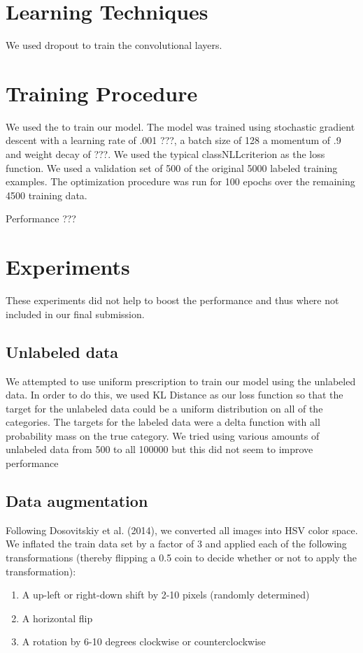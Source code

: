 \documentclass{article} %
\begin{document}
\section{Learning Techniques}

We used dropout to train the convolutional layers.

\section{Training Procedure}

We used the to train our model. The model was trained 
using stochastic gradient descent with a learning rate of .001 ???,
a batch size of 128 a momentum of .9 and weight decay of ???.  We
used the typical classNLLcriterion as the loss function. We used a validation set of 500 
of the original 5000 labeled training examples. The optimization procedure was run for 
100 epochs over the remaining 4500 training data.

Performance ???

\section{Experiments}

These experiments did not help to boost the performance and thus where not included in our final submission.

\subsection{Unlabeled data}
We attempted to use uniform prescription to train our model using the unlabeled data. In order to 
do this, we used KL Distance as our loss function so that the target for the unlabeled data could be
a uniform distribution on all of the categories. The targets for the labeled data were a delta function
with all probability mass on the true category. We tried using various amounts of unlabeled data from
500 to all 100000 but this did not seem to improve performance

\subsection{Data augmentation}
Following Dosovitskiy et al. (2014), we converted all images into HSV color space. We inflated the train data set by a factor of 3 and applied each of the following transformations (thereby flipping a 0.5 coin to decide whether or not to apply the transformation):
\begin{enumerate}
	\item A up-left or right-down shift by 2-10 pixels (randomly determined)
	\item A horizontal flip
	\item A rotation by 6-10 degrees clockwise or counterclockwise
\end{enumerate}
\end{document}

